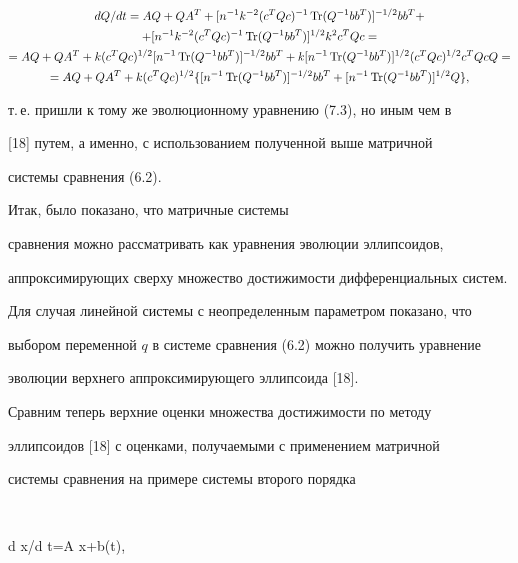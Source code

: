 \begin{gather*} 


d Q/d t=A Q+Q A^T+[n^{-1}k^{-2}(c^T Q c)^{-1}\Tr(Q^{-1} 


b b^T)]^{-1/2}b b^T + \\ +[n^{-1}k^{-2}(c^T Q c)^{-1}\Tr 


(Q^{-1}b b^T)]^{1/2}k^2c^T Q c=\\ 


% 


=A Q+Q A^T+k(c^T Q c)^{1/2}[n^{-1}\Tr(Q^{-1}b b^T)]^{-1/2} 


b b^T+k[n^{-1}\Tr(Q^{-1}b b^T)]^{1/2}(c^TQ c)^{1/2} 


c^TQ c Q= \\ 


% 


=A Q+Q A^T+k(c^T Q c)^{1/2}\{[n^{-1}\Tr(Q^{-1}b b^T)]^{-1/2} 


b b^T+[n^{-1}\Tr(Q^{-1}b b^T)]^{1/2}Q\}, 


\end{gather*} 


т.\,е. пришли к тому же эволюционному уравнению (7.3), но иным чем в 


[18] путем, а именно, с использованием полученной выше матричной 


системы сравнения (6.2). 


 


Итак, было показано, что матричные системы 


сравнения можно рассматривать как уравнения эволюции эллипсоидов, 


аппроксимирующих сверху множество достижимости дифференциальных систем. 


Для случая линейной системы с неопределенным параметром показано, что 


выбором переменной $q$ в системе сравнения (6.2) можно получить уравнение 


эволюции верхнего аппроксимирующего эллипсоида [18]. 


 


Сравним теперь верхние оценки множества достижимости по методу 


эллипсоидов [18] с оценками, получаемыми с применением матричной 


системы сравнения на примере системы второго порядка 


$$ 


d x/d t=A x+b\sigma \eta(t),\quad 


